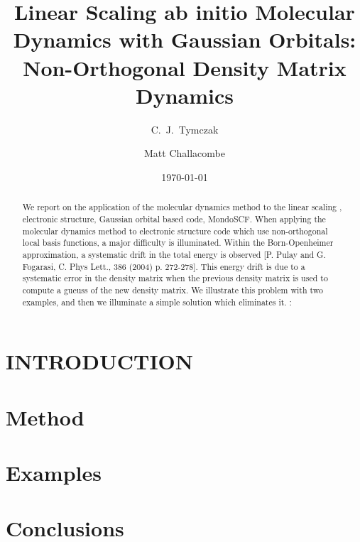 \commentoutA{\documentclass[prb,aps,twocolumn,twocolumngrid,superbib]{revtex4}}
\begin{document}
\date{\today}

\title{Linear Scaling ab initio Molecular Dynamics with Gaussian Orbitals:
Non-Orthogonal Density Matrix Dynamics }

\author{C.~J.~Tymczak}
\author{Matt Challacombe}

\begin{abstract}
We report on the application of the molecular dynamics method to the linear scaling , electronic structure, 
Gaussian orbital based code, MondoSCF.  When applying the molecular dynamics method to electronic structure 
code which use non-orthogonal local basis functions, a major difficulty is illuminated. Within the  
Born-Openheimer approximation, a systematic drift in the total energy is observed [P. Pulay and G. Fogarasi, 
C. Phys Lett., 386 (2004) p. 272-278]. This energy drift is due to a systematic error in the density matrix 
when the previous density matrix is used to compute a gueuss of the new density matrix. We illustrate this 
problem with two examples, and then we illuminate a simple solution which eliminates it.
: 

%
\end{abstract}

\pacs{}

\maketitle

\footnotetext[1]{}
\footnotetext[2]{}

\section{INTRODUCTION}

\section{Method}

\section{Examples}

\section{Conclusions}
\end{document}
